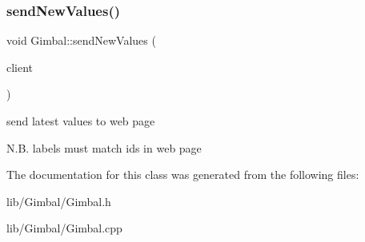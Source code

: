 \subsubsection{\texorpdfstring{send\+New\+Values()}{sendNewValues()}}
{\footnotesize\ttfamily void Gimbal\+::send\+New\+Values (\begin{DoxyParamCaption}\item[{Wi\+Fi\+Client}]{client }\end{DoxyParamCaption})}



send latest values to web page 

N.\+B. labels must match ids in web page 

The documentation for this class was generated from the following files\+:\begin{DoxyCompactItemize}
\item 
lib/\+Gimbal/Gimbal.\+h\item 
lib/\+Gimbal/Gimbal.\+cpp\end{DoxyCompactItemize}
